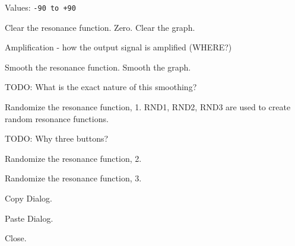    Values: \texttt{-90 to +90}

   Clear the resonance function.
   Zero. Clear the graph.

   Amplification - how the output signal is amplified (WHERE?)

   Smooth the resonance function.
   Smooth the graph.

   TODO:  What is the exact nature of this smoothing?

   Randomize the resonance function, 1.
   RND1, RND2, RND3 are used to create random resonance functions.

   TODO:  Why three buttons?

   Randomize the resonance function, 2.

   Randomize the resonance function, 3.

   Copy Dialog.

   Paste Dialog.

   Close.

